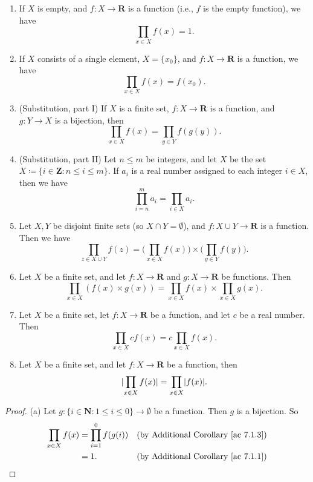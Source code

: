 \begin{additional corollary}\label{ac 7.1.5}
    \mbox{}
    \begin{enumerate}
    \item If \(X\) is empty, and \(f : X \to \mathbf{R}\) is a function (i.e., \(f\) is the empty function), we have
    \[
        \prod_{x \in X} f(x) = 1.
    \]
    \item If \(X\) consists of a single element, \(X = \{x_0\}\), and \(f : X \to \mathbf{R}\) is a function, we have
    \[
        \prod_{x \in X} f(x) = f(x_0).
    \]
    \item (Substitution, part I) If \(X\) is a finite set, \(f : X \to \mathbf{R}\) is a function, and \(g : Y \to X\) is a bijection, then
    \[
        \prod_{x \in X} f(x) = \prod_{y \in Y} f(g(y)).
    \]
    \item (Substitution, part II) Let \(n \leq m\) be integers, and let \(X\) be the set \(X \coloneqq \{i \in \mathbf{Z} : n \leq i \leq m\}\).
    If \(a_i\) is a real number assigned to each integer \(i \in X\), then we have
    \[
        \prod_{i = n}^m a_i = \prod_{i \in X} a_i.
    \]
    \item Let \(X, Y\) be disjoint finite sets (so \(X \cap Y = \emptyset\)), and \(f : X \cup Y \to \mathbf{R}\) is a function.
    Then we have
    \[
        \prod_{z \in X \cup Y} f(z) = \Bigg(\prod_{x \in X} f(x)\Bigg) \times \Bigg(\prod_{y \in Y} f(y)\Bigg).
    \]
    \item Let \(X\) be a finite set, and let \(f : X \to \mathbf{R}\) and \(g : X \to \mathbf{R}\) be functions.
    Then
    \[
        \prod_{x \in X} (f(x) \times g(x)) = \prod_{x \in X} f(x) \times \prod_{x \in X} g(x).
    \]
    \item Let \(X\) be a finite set, let \(f : X \to \mathbf{R}\) be a function, and let \(c\) be a real number.
    Then
    \[
        \prod_{x \in X} cf(x) = c\prod_{x \in X} f(x).
    \]
    \item Let \(X\) be a finite set, and let \(f : X \to \mathbf{R}\) be a function, then
    \[
        \lvert\prod_{x \in X} f(x)\rvert = \prod_{x \in X} \lvert f(x)\rvert.
    \]
    \end{enumerate}
\end{additional corollary}

\begin{proof}{(a)}
Let \(g : \{i \in \mathbf{N} : 1 \leq i \leq 0\} \to \emptyset\) be a function.
Then \(g\) is a bijection.
So
\begin{align*}
\prod_{x \in X} f(x) &= \prod_{i = 1}^0 f(g(i)) & \text{(by Additional Corollary \ref{ac 7.1.3})} \\
&= 1. & \text{(by Additional Corollary \ref{ac 7.1.1})}
\end{align*}
\end{proof}

